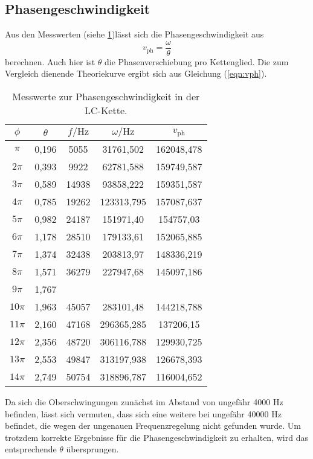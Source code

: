   \subsection{Phasengeschwindigkeit}
  Aus den Messwerten (siehe \ref{tab:v-phase})lässt sich die Phasengeschwindigkeit aus
  \begin{equation}
    v_\mathrm{ph} = \frac{\omega}{\theta}
  \end{equation}
  berechnen. Auch hier ist $\theta$ die Phasenverschiebung pro Kettenglied.
  Die zum Vergleich dienende Theoriekurve ergibt sich aus Gleichung (\ref{eqn:vph}).

  \begin{table}
    \centering
    \caption{Messwerte zur Phasengeschwindigkeit in der LC-Kette.}
    \label{tab:v-phase}
    \begin{tabular}{c c c c c}
      \toprule
      $\phi$ & $\theta$ & $f / \si{\hertz}$ & $\omega / \si{\hertz}$ & $v_\mathrm{ph}$ \\
      \midrule
$\pi$ & 0,196 & 5055 & 31761,502 & 162048,478 \\
$2\pi$ & 0,393 &  9922 &  62781,588 & 159749,587 \\
$3\pi$ & 0,589 & 14938 & 93858,222 & 159351,587 \\
$4\pi$ & 0,785 & 19262 & 123313,795 & 157087,637 \\
$5\pi$ & 0,982 & 24187 & 151971,40 & 154757,03 \\
$6\pi$ & 1,178 & 28510 & 179133,61 & 152065,885 \\
$7\pi$ & 1,374 & 32438 & 203813,97 & 148336,219 \\
$8\pi$ &  1,571 & 36279 & 227947,68 & 145097,186 \\
$9\pi$ & 1,767  \\
$10\pi$ & 1,963 & 45057 & 283101,48 & 144218,788 \\
$11\pi$ &  2,160 & 47168 & 296365,285 & 137206,15 \\
$12\pi$ & 2,356 & 48720 & 306116,788 & 129930,725 \\
$13\pi$ & 2,553 & 49847 & 313197,938 & 126678,393 \\
$14\pi$ & 2,749 & 50754 & 318896,787 & 116004,652 \\
\bottomrule
\end{tabular}
\end{table}

Da sich die Oberschwingungen zunächst im Abstand von ungefähr 4000 \si{\Hz} befinden, lässt sich vermuten, dass sich eine weitere bei ungefähr 40000 \si{\Hz} befindet, die wegen der ungenauen Frequenzregelung nicht gefunden wurde.
Um trotzdem korrekte Ergebnisse für die Phasengeschwindigkeit zu erhalten, wird das entsprechende $\theta$ übersprungen.

